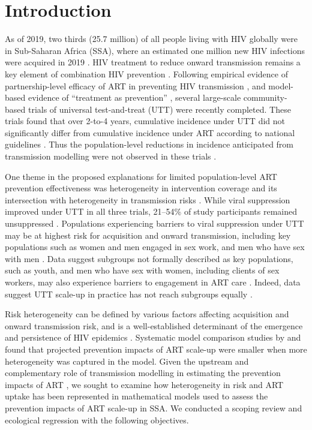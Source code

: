 \section{Introduction}
\label{s:intro}
As of 2019, two thirds (25.7 million) of all people living with HIV globally
were in Sub-Saharan Africa (SSA), where
an estimated one million new HIV infections were acquired in 2019 \cite{AIDSinfo}.
HIV treatment to reduce onward transmission remains a key element of combination HIV prevention \cite{WHO2016ART}.
Following empirical evidence of partnership-level efficacy of ART
in preventing HIV transmission \cite{Lundgren2015,Danel2015,Cohen2016},
and model-based evidence of ``treatment as prevention'' \cite{Granich2009,Eaton2012,Cori2014},
several large-scale community-based trials of universal test-and-treat (UTT) were recently completed.
These trials found that over 2-to-4 years,
cumulative incidence under UTT did not significantly differ from
cumulative incidence under ART according to national guidelines \cite{Havlir2019,Hayes2019,Iwuji2018}.
Thus the population-level reductions in incidence anticipated from transmission modelling
were not observed in these trials \cite{Baral2019,Havlir2020}.
\par
One theme in the proposed explanations for limited population-level ART prevention effectiveness
was heterogeneity in intervention coverage and its intersection with
heterogeneity in transmission risks \cite{AbdoolKarim2019,Baral2019}.
While viral suppression improved under UTT in all three trials,
21--54\% of study participants remained unsuppressed \cite{Iwuji2018,Havlir2019,Hayes2019}.
Populations experiencing barriers to viral suppression under UTT
may be at highest risk for acquisition and onward transmission, including key populations such as
women and men engaged in sex work, and men who have sex with men \cite{Hakim2018,Nyato2019}.
Data suggest subgroups not formally described as key populations,
such as youth, and men who have sex with women, including clients of sex workers, may also
experience barriers to engagement in ART care \cite{Arnesen2017,Chikwari2018,Quinn2019}.
Indeed, data suggest UTT scale-up in practice has not reach subgroups equally \cite{Green2020}.
\par
Risk heterogeneity can be defined by various factors affecting acquisition and onward transmission risk,
and is a well-established determinant of the emergence and persistence of HIV epidemics \cite{Anderson1986,Boily1997}.
Systematic model comparison studies by \citet{Hontelez2013} and \citet{Rozhnova2016}
found that projected prevention impacts of ART scale-up
were smaller when more heterogeneity was captured in the model.
Given the upstream and complementary role of transmission modelling
in estimating the prevention impacts of ART \cite{Eaton2012,Delva2012},
we sought to examine how heterogeneity in risk and ART uptake has been represented
in mathematical models used to assess the prevention impacts of ART scale-up in SSA.
We conducted a scoping review and ecological regression with the following objectives.


